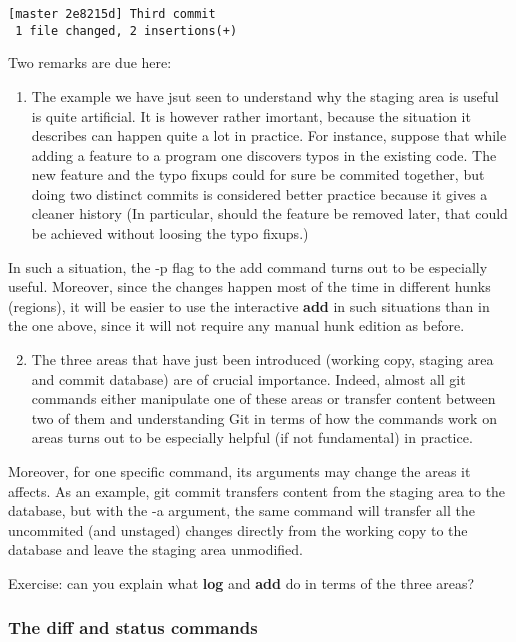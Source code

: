\documentclass{article}
\begin{document}
    \begin{Verbatim}[commandchars=\\\{\}]
[master 2e8215d] Third commit
 1 file changed, 2 insertions(+)
    \end{Verbatim}

    Two remarks are due here:

\begin{enumerate}[1.]
\item
  The example we have jsut seen to understand why the staging area is
  useful is quite artificial. It is however rather imortant, because the
  situation it describes can happen quite a lot in practice. For
  instance, suppose that while adding a feature to a program one
  discovers typos in the existing code. The new feature and the typo
  fixups could for sure be commited together, but doing two distinct
  commits is considered better practice because it gives a cleaner
  history (In particular, should the feature be removed later, that
  could be achieved without loosing the typo fixups.)
\end{enumerate}
In such a situation, the -p flag to the add command turns out to be
especially useful. Moreover, since the changes happen most of the time
in different hunks (regions), it will be easier to use the interactive
\textbf{add} in such situations than in the one above, since it will not
require any manual hunk edition as before.

\begin{enumerate}[1.]
\setcounter{enumi}{1}
\item
  The three areas that have just been introduced (working copy, staging
  area and commit database) are of crucial importance. Indeed, almost
  all git commands either manipulate one of these areas or transfer
  content between two of them and understanding Git in terms of how the
  commands work on areas turns out to be especially helpful (if not
  fundamental) in practice.
\end{enumerate}
Moreover, for one specific command, its arguments may change the areas
it affects. As an example, git commit transfers content from the staging
area to the database, but with the -a argument, the same command will
transfer all the uncommited (and unstaged) changes directly from the
working copy to the database and leave the staging area unmodified.

Exercise: can you explain what \textbf{log} and \textbf{add} do in terms
of the three areas?


    \subsubsection{The diff and status commands}
\end{document}
